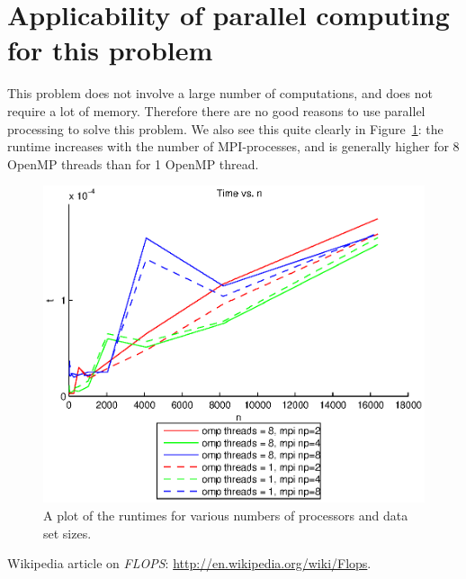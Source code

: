 \section{Applicability of parallel computing for this problem} %
\label{sec:applicability_of_parallel_computing_for_this_problem}
This problem does not involve a large number of computations, and does not require a lot of memory. Therefore there are no good reasons to use parallel processing to solve this problem. We also see this quite clearly in Figure~\ref{fig:runtime}: the runtime increases with the number of MPI-processes, and is generally higher for 8 OpenMP threads than for 1 OpenMP thread.

\begin{figure}[H]
  \centering
  \includegraphics[]{graphics/runtime.eps}
  \caption{A plot of the runtimes for various numbers of processors and data set sizes.}
  \label{fig:runtime}
\end{figure}

\begin{thebibliography}{1}
   Wikipedia article on \emph{FLOPS}: \url{http://en.wikipedia.org/wiki/Flops}.
\end{thebibliography}


